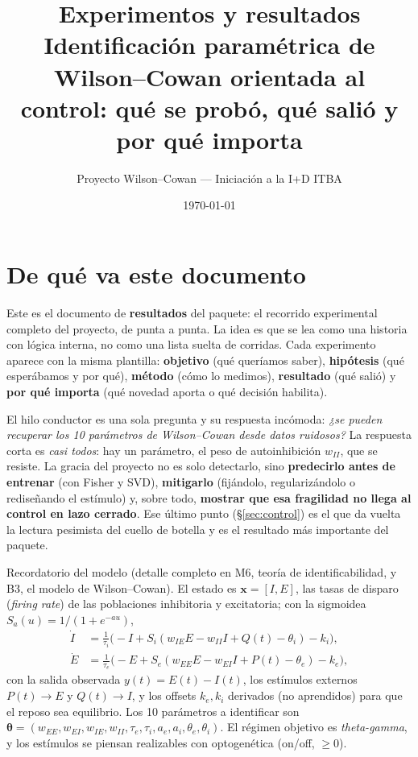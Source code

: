 \documentclass[11pt,a4paper]{article}
\title{\textbf{Experimentos y resultados}\\[2pt]\large Identificación paramétrica de Wilson--Cowan orientada al control: qué se probó, qué salió y por qué importa}
\author{Proyecto Wilson--Cowan --- Iniciación a la I+D ITBA}
\date{\today}
\newcommand{\thetavec}{\bm{\theta}}
\begin{document}
\maketitle
\tableofcontents
\bigskip

\section{De qué va este documento}

Este es el documento de \textbf{resultados} del paquete: el recorrido experimental completo del proyecto, de punta a punta. La idea es que se lea como una historia con lógica interna, no como una lista suelta de corridas. Cada experimento aparece con la misma plantilla: \textbf{objetivo} (qué queríamos saber), \textbf{hipótesis} (qué esperábamos y por qué), \textbf{método} (cómo lo medimos), \textbf{resultado} (qué salió) y \textbf{por qué importa} (qué novedad aporta o qué decisión habilita).

El hilo conductor es una sola pregunta y su respuesta incómoda: \emph{¿se pueden recuperar los 10 parámetros de Wilson--Cowan desde datos ruidosos?} La respuesta corta es \emph{casi todos}: hay un parámetro, el peso de autoinhibición $w_{II}$, que se resiste. La gracia del proyecto no es solo detectarlo, sino \textbf{predecirlo antes de entrenar} (con Fisher y SVD), \textbf{mitigarlo} (fijándolo, regularizándolo o rediseñando el estímulo) y, sobre todo, \textbf{mostrar que esa fragilidad no llega al control en lazo cerrado}. Ese último punto (§\ref{sec:control}) es el que da vuelta la lectura pesimista del cuello de botella y es el resultado más importante del paquete.

Recordatorio del modelo (detalle completo en M6, teoría de identificabilidad, y B3, el modelo de Wilson--Cowan). El estado es $\mathbf{x}=[I,E]$, las tasas de disparo (\emph{firing rate}) de las poblaciones inhibitoria y excitatoria; con la sigmoidea $S_a(u)=1/(1+e^{-au})$,
\begin{align}
\dot I &= \tfrac{1}{\tau_i}\big(-I + S_i(w_{IE}E - w_{II}I + Q(t) - \theta_i) - k_i\big),\\
\dot E &= \tfrac{1}{\tau_e}\big(-E + S_e(w_{EE}E - w_{EI}I + P(t) - \theta_e) - k_e\big),
\end{align}
con la salida observada $y(t)=E(t)-I(t)$, los estímulos externos $P(t)\!\to\!E$ y $Q(t)\!\to\!I$, y los offsets $k_e,k_i$ derivados (no aprendidos) para que el reposo sea equilibrio. Los 10 parámetros a identificar son $\thetavec=(w_{EE},w_{EI},w_{IE},w_{II},\tau_e,\tau_i,a_e,a_i,\theta_e,\theta_i)$. El régimen objetivo es \emph{theta-gamma}, y los estímulos se piensan realizables con optogenética (on/off, $\ge 0$).
\end{document}
